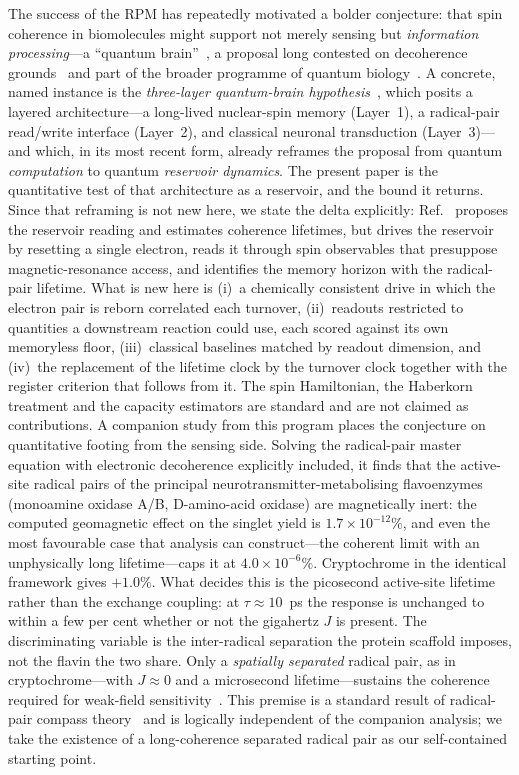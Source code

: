 \documentclass[aps,prx,reprint,superscriptaddress,nofootinbib,floatfix]{revtex4-2}
\begin{document}
The success of the RPM has repeatedly motivated a bolder conjecture: that
spin coherence in biomolecules might support not merely sensing but
\emph{information processing}---a ``quantum brain''~\cite{Fisher2015,Kerskens2022},
a proposal long contested on decoherence grounds~\cite{Tegmark2000} and part of the
broader programme of quantum biology~\cite{Lambert2013,Cao2020}.
A concrete, named instance is the \emph{three-layer quantum-brain
hypothesis}~\cite{Wakaura2025,Wakaura2026}, which posits a layered architecture---a
long-lived nuclear-spin memory (Layer~1), a radical-pair read/write interface
(Layer~2), and classical neuronal transduction (Layer~3)---and which, in its most
recent form, already reframes the proposal from quantum \emph{computation} to
quantum \emph{reservoir dynamics}. The present paper is the quantitative test of
that architecture as a reservoir, and the bound it returns. Since that reframing
is not new here, we state the delta explicitly: Ref.~\cite{Wakaura2026} proposes
the reservoir reading and estimates coherence lifetimes, but drives the reservoir
by resetting a single electron, reads it through spin observables that presuppose
magnetic-resonance access, and identifies the memory horizon with the
radical-pair lifetime. What is new here is (i)~a chemically consistent drive in
which the electron pair is reborn correlated each turnover, (ii)~readouts
restricted to quantities a downstream reaction could use, each scored against its
own memoryless floor, (iii)~classical baselines matched by readout dimension, and
(iv)~the replacement of the lifetime clock by the turnover clock together with
the register criterion that follows from it. The spin Hamiltonian, the Haberkorn
treatment and the capacity estimators are standard and are not claimed as
contributions. A companion study from
this program places the conjecture on quantitative footing from the sensing side. Solving the radical-pair master equation with electronic
decoherence explicitly included, it finds that the active-site radical pairs of
the principal neurotransmitter-metabolising flavoenzymes (monoamine oxidase A/B,
D-amino-acid oxidase) are magnetically inert: the computed geomagnetic effect on
the singlet yield is $1.7\times10^{-12}\%$, and even the most favourable case that
analysis can construct---the coherent limit with an unphysically long
lifetime---caps it at $4.0\times10^{-6}\%$. Cryptochrome in the identical
framework gives $+1.0\%$. What decides this is the picosecond active-site
lifetime rather than the exchange coupling: at $\tau\approx10$~ps the response is
unchanged to within a few per cent whether or not the gigahertz $J$ is present.
The discriminating variable is the inter-radical separation the protein scaffold
imposes, not the flavin the two share. Only a \emph{spatially separated}
radical pair, as in cryptochrome---with $J\approx0$ and a microsecond
lifetime---sustains the coherence required for weak-field
sensitivity~\cite{Efimova2008,Companion2026}. This premise is a standard result of
radical-pair compass theory~\cite{Efimova2008,Hore2016} and is logically
independent of the companion analysis; we take the existence of a long-coherence
separated radical pair as our self-contained starting point.
\end{document}
